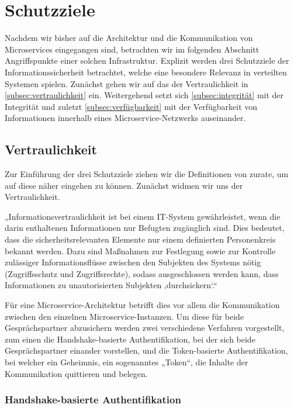 \section{Schutzziele}
Nachdem wir bisher auf die Architektur und die Kommunikation von Microservices eingegangen sind, betrachten wir im folgenden Abschnitt Angriffspunkte einer solchen Infrastruktur. Explizit werden drei Schutzziele der Informationssicherheit betrachtet, welche eine besondere Relevanz in verteilten Systemen spielen. Zunächst gehen wir auf das der Vertraulichkeit in \autoref{subsec:vertraulichkeit} ein. Weitergehend setzt sich \autoref{subsec:integrität} mit der Integrität und zuletzt \autoref{subsec:verfügbarkeit} mit der Verfügbarkeit von Informationen innerhalb eines Microservice-Netzwerks auseinander.


\subsection{Vertraulichkeit}
\label{subsec:vertraulichkeit}

Zur Einführung der drei Schutzziele ziehen wir die Definitionen von \citeauthor{Bedner+10} zurate, um auf diese näher eingehen zu können. Zunächst widmen wir uns der Vertraulichkeit.

„Informationsvertraulichkeit ist bei einem IT-System gewährleistet, wenn die darin enthaltenen Informationen nur Befugten zugänglich sind. Dies bedeutet, dass die sicherheitsrelevanten Elemente nur einem definierten Personenkreis bekannt werden. Dazu sind Maßnahmen zur Festlegung sowie zur Kontrolle zulässiger Informationsflüsse zwischen den Subjekten des Systems nötig (Zugriffsschutz und Zugriffsrechte), sodass ausgeschlossen werden kann, dass Informationen zu unautorisierten Subjekten ‚durchsickern‘.“ \cite{Bedner+10}

Für eine Microservice-Architektur betrifft dies vor allem die Kommunikation zwischen den einzelnen Microservice-Instanzen. Um diese für beide Gesprächspartner abzusichern werden zwei verschiedene Verfahren vorgestellt, zum einen die Handshake-basierte Authentifikation, bei der sich beide Gesprächspartner einander vorstellen, und die Token-basierte Authentifikation, bei welcher ein Geheimnis, ein sogenanntes „Token“, die Inhalte der Kommunikation quittieren und belegen.

\subsubsection{Handshake-basierte Authentifikation}

